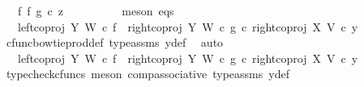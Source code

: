 \begin{isabellebody}
\ {\isachardoublequoteopen}{\isachardot}{\kern0pt}{\isachardot}{\kern0pt}{\isachardot}{\kern0pt}\ {\isacharequal}{\kern0pt}\ {\isacharparenleft}{\kern0pt}f\ {\isasymbowtie}\isactrlsub f\ g{\isacharparenright}{\kern0pt}\ {\isasymcirc}\isactrlsub c\ z{}{\isachardoublequoteclose}\isanewline
\ \ \ \ \ \ \ \ \isamarkupfalse%
\ {\isacharparenleft}{\kern0pt}meson\ eqs{\isacharparenright}{\kern0pt}\isanewline
\ \ \ \ \ \ \isamarkupfalse%
\ \isamarkupfalse%
\ {\isachardoublequoteopen}{\isachardot}{\kern0pt}{\isachardot}{\kern0pt}{\isachardot}{\kern0pt}\ {\isacharequal}{\kern0pt}\ {\isacharparenleft}{\kern0pt}{\isacharparenleft}{\kern0pt}left{\isacharunderscore}{\kern0pt}coproj\ Y\ W\ {\isasymcirc}\isactrlsub c\ f{\isacharparenright}{\kern0pt}\ {\isasymamalg}\ {\isacharparenleft}{\kern0pt}right{\isacharunderscore}{\kern0pt}coproj\ Y\ W\ {\isasymcirc}\isactrlsub c\ g{\isacharparenright}{\kern0pt}{\isacharparenright}{\kern0pt}\ {\isasymcirc}\isactrlsub c\ right{\isacharunderscore}{\kern0pt}coproj\ X\ V\ {\isasymcirc}\isactrlsub c\ y{}{\isachardoublequoteclose}\isanewline
\ \ \ \ \ \ \ \ \isamarkupfalse%
\ cfunc{\isacharunderscore}{\kern0pt}bowtie{\isacharunderscore}{\kern0pt}prod{\isacharunderscore}{\kern0pt}def{}\ type{\isacharunderscore}{\kern0pt}assms\ y{}{\isacharunderscore}{\kern0pt}def\ \isamarkupfalse%
\ auto\isanewline
\ \ \ \ \ \ \isamarkupfalse%
\ \isamarkupfalse%
\ {\isachardoublequoteopen}{\isachardot}{\kern0pt}{\isachardot}{\kern0pt}{\isachardot}{\kern0pt}\ {\isacharequal}{\kern0pt}\ {\isacharparenleft}{\kern0pt}{\isacharparenleft}{\kern0pt}{\isacharparenleft}{\kern0pt}left{\isacharunderscore}{\kern0pt}coproj\ Y\ W\ {\isasymcirc}\isactrlsub c\ f{\isacharparenright}{\kern0pt}\ {\isasymamalg}\ {\isacharparenleft}{\kern0pt}right{\isacharunderscore}{\kern0pt}coproj\ Y\ W\ {\isasymcirc}\isactrlsub c\ g{\isacharparenright}{\kern0pt}{\isacharparenright}{\kern0pt}\ {\isasymcirc}\isactrlsub c\ right{\isacharunderscore}{\kern0pt}coproj\ X\ V{\isacharparenright}{\kern0pt}\ {\isasymcirc}\isactrlsub c\ y{}{\isachardoublequoteclose}\isanewline
\ \ \ \ \ \ \ \ \isamarkupfalse%
\ {\isacharparenleft}{\kern0pt}typecheck{\isacharunderscore}{\kern0pt}cfuncs{\isacharcomma}{\kern0pt}\ meson\ comp{\isacharunderscore}{\kern0pt}associative{}\ type{\isacharunderscore}{\kern0pt}assms\ y{}{\isacharunderscore}{\kern0pt}def{\isacharparenright}{\kern0pt}\isanewline
\ \ \ \ \ \ \isamarkupfalse%

\end{isabellebody}
